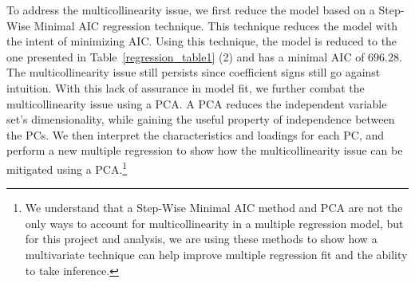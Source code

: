 \documentclass[letterpaper, 12pt]{article}
\begin{document}
	\noindent
	To address the multicollinearity issue, we first reduce the model based on a Step-Wise Minimal AIC regression technique.  This technique reduces the model with the intent of minimizing AIC.  Using this technique, the model is reduced to the one presented in Table~\ref{regression_table1} (2) and has a minimal AIC of $696.28$.  The multicollinearity issue still persists since coefficient signs still go against intuition.  With this lack of assurance in model fit, we further combat the multicollinearity issue using a PCA. A  PCA reduces the independent variable set's dimensionality, while gaining the useful property of independence between the PCs.  We then interpret the characteristics and loadings for each PC, and perform a new multiple regression to show how the multicollinearity issue can be mitigated using a PCA.\footnote{We understand that a Step-Wise Minimal AIC method and PCA are not the only ways to account for multicollinearity in a multiple regression model, but for this project and analysis, we are using these methods to show how a multivariate technique can help improve multiple regression fit and the ability to take inference.}
	
\end{document}

